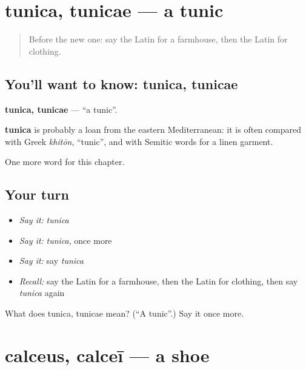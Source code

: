 \section[tunica, tunicae]{tunica, tunicae — a tunic}

\label{lesson:LA-C108-tunica}



\begin{quote}
Before the new one: say the Latin for a farmhouse, then the Latin for clothing.
\end{quote}

\subsection*{You'll want to know: tunica, tunicae}
\textbf{tunica, tunicae} — \textquotedblleft{}a tunic\textquotedblright{}.

\begin{cousinweb}
\textbf{tunica} is probably a loan from the eastern Mediterranean: it is often compared with Greek \emph{khitōn}, \textquotedblleft{}tunic\textquotedblright{}, and with Semitic words for a linen garment.
\end{cousinweb}

\begin{grammarlens}[title={What you've built}]
One more word for this chapter.
\end{grammarlens}

\subsection*{Your turn}
\begin{itemize}
\raggedright
  \item \emph{Say it:} \emph{tunica}
  \item \emph{Say it:} \emph{tunica}, once more
  \item \emph{Say it:} say \emph{tunica}
  \item \emph{Recall:} say the Latin for a farmhouse, then the Latin for clothing, then say \emph{tunica} again
\end{itemize}

\begin{tcolorbox}[breakable,colback=teal!4,colframe=teal!35!black,title={Before you move on}]
What does tunica, tunicae mean? (\textquotedblleft{}A tunic\textquotedblright{}.) Say it once more.
\end{tcolorbox}
\section[calceus, calceī]{calceus, calceī — a shoe}

